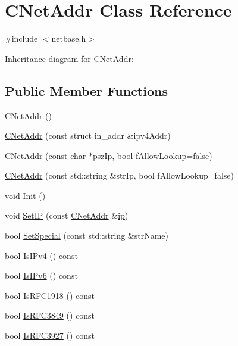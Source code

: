 \hypertarget{class_c_net_addr}{}\section{C\+Net\+Addr Class Reference}
\label{class_c_net_addr}


{\ttfamily \#include $<$netbase.\+h$>$}



Inheritance diagram for C\+Net\+Addr\+:
\subsection*{Public Member Functions}
\begin{DoxyCompactItemize}
\item 
\hyperlink{class_c_net_addr_ad997a7ab057fbeab1dd6601135f8e02d}{C\+Net\+Addr} ()
\item 
\hyperlink{class_c_net_addr_a0af492cd8aca9bbaa3392cdbfbb55681}{C\+Net\+Addr} (const struct in\+\_\+addr \&ipv4\+Addr)
\item 
\hyperlink{class_c_net_addr_a3549332f92d95ccadf262bdce9f4eacf}{C\+Net\+Addr} (const char $\ast$psz\+Ip, bool f\+Allow\+Lookup=false)
\item 
\hyperlink{class_c_net_addr_ae237602be0e4bce6ff31061270371144}{C\+Net\+Addr} (const std\+::string \&str\+Ip, bool f\+Allow\+Lookup=false)
\item 
void \hyperlink{class_c_net_addr_adab412fbc5a9203bea90ae173996ab10}{Init} ()
\item 
void \hyperlink{class_c_net_addr_a1c6087345e5ca07a151451cd6deb974f}{Set\+I\+P} (const \hyperlink{class_c_net_addr}{C\+Net\+Addr} \&\hyperlink{class_c_net_addr_acff7ce68f33f8dfbfe6d79d80928d417}{ip})
\item 
bool \hyperlink{class_c_net_addr_aa3e44dfd064d9d8da1cb48cdcb7dd231}{Set\+Special} (const std\+::string \&str\+Name)
\item 
bool \hyperlink{class_c_net_addr_a16ff4478f02f06f5a9a038a24d5da2f9}{Is\+I\+Pv4} () const 
\item 
bool \hyperlink{class_c_net_addr_a0edb022cd6a186de8099799415409d57}{Is\+I\+Pv6} () const 
\item 
bool \hyperlink{class_c_net_addr_a81b190a7e0b05b93bf3097ba43e5cec1}{Is\+R\+F\+C1918} () const 
\item 
bool \hyperlink{class_c_net_addr_a639dff0ffea6ad930353784686def39b}{Is\+R\+F\+C3849} () const 
\item 
bool \hyperlink{class_c_net_addr_a3d8e5495fd3a2f92bedf272452a2d4b0}{Is\+R\+F\+C3927} () const 

\end{DoxyCompactItemize}
